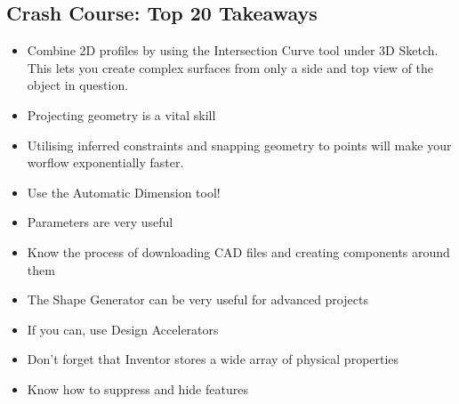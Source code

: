 \subsection{Crash Course: Top 20 Takeaways}

\begin{itemize}
\item Combine 2D profiles by using the Intersection Curve tool under 3D Sketch. This lets you create complex surfaces from only a side and top view of the object in question.
\item Projecting geometry is a vital skill
\item Utilising inferred constraints and snapping geometry to points will make your worflow exponentially faster.
\item Use the Automatic Dimension tool!
\item Parameters are very useful
\item Know the process of downloading CAD files and creating components around them
\item The Shape Generator can be very useful for advanced projects
\item If you can, use Design Accelerators
\item Don't forget that Inventor stores a wide array of physical properties
\item Know how to suppress and hide features
\end{itemize}